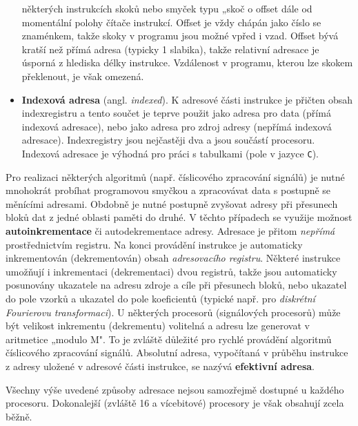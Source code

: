 \begin{itemize}[noitemsep]
                některých instrukcích skoků nebo smyček typu „skoč o offset dále od momentální 
                polohy čítače instrukcí. Offset je vždy chápán jako číslo se znaménkem, takže skoky 
                v programu jsou možné vpřed i vzad. Offset bývá kratší než přímá adresa (typicky 1 
                slabika), takže relativní adresace je úsporná z hlediska délky instrukce. 
                Vzdálenost v programu, kterou lze skokem překlenout, je však omezená.
          \item \textbf{Indexová adresa} (angl. \emph{indexed}). K adresové části instrukce je  
                přičten obsah indexregistru a tento součet je teprve použit jako adresa pro data 
                (přímá indexová adresace), nebo jako adresa pro zdroj adresy (nepřímá indexová 
                adresace). Indexregistry jsou nejčastěji dva a jsou součástí procesoru. Indexová 
                adresace je výhodná pro práci s tabulkami (pole v jazyce \texttt{C}).
        \end{itemize}
        
        Pro realizaci některých algoritmů (např. číslicového zpracování signálů) je nutné mnohokrát 
        probíhat programovou smyčkou a zpracovávat data s postupně se měnícími adresami. Obdobně je 
        nutné postupně zvyšovat adresy při přesunech bloků dat z jedné oblasti paměti do druhé. V 
        těchto případech se využije možnost \textbf{autoinkrementace} či autodekrementace adresy. 
        Adresace je přitom \emph{nepřímá} prostřednictvím registru. Na konci provádění instrukce je 
        automaticky inkrementován (dekrementován) obsah \emph{adresovacího registru}. Některé 
        instrukce umožňují i inkrementaci (dekrementaci) dvou registrů, takže jsou automaticky 
        posunovány ukazatele na adresu zdroje a cíle při přesunech bloků, nebo ukazatel do pole 
        vzorků a ukazatel do pole koeficientů (typické např. pro \emph{diskrétní Fourierovu 
        transformaci}). U některých procesorů (signálových procesorů) může být velikost inkrementu 
        (dekrementu) volitelná a adresu lze generovat v aritmetice „modulo M". To je zvláště 
        důležité pro rychlé provádění algoritmů číslicového zpracování signálů. Absolutní adresa, 
        vypočítaná v průběhu instrukce z adresy uložené v adresové části instrukce, se nazývá 
        \textbf{efektivní adresa}.
        
        Všechny výše uvedené způsoby adresace nejsou samozřejmě dostupné u každého procesoru. 
        Dokonalejší (zvláště 16 a vícebitové) procesory je však obsahují zcela běžně.
        
